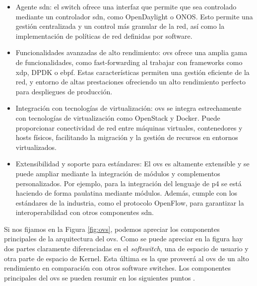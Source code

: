 \begin{itemize}
    \item Agente \gls{sdn}: el switch ofrece una interfaz que permite que sea controlado mediante un controlador \gls{sdn}, como OpenDaylight o ONOS. Esto permite una gestión centralizada y un control más granular de la red, así como la implementación de políticas de red definidas por software.
    \item Funcionalidades avanzadas de alto rendimiento: \gls{ovs} ofrece una amplia gama de funcionalidades, como fast-forwarding al trabajar con frameworks como \gls{xdp}, DPDK o \gls{ebpf}. Estas características permiten una gestión eficiente de la red, y entorno de altas prestaciones ofreciendo un alto rendimiento perfecto para despliegues de producción.
    \item Integración con tecnologías de virtualización: \gls{ovs} se integra estrechamente con tecnologías de virtualización como OpenStack y Docker. Puede proporcionar conectividad de red entre máquinas virtuales, contenedores y hosts físicos, facilitando la migración y la gestión de recursos en entornos virtualizados.
    \item Extensibilidad y soporte para estándares: El \gls{ovs} es altamente extensible y se puede ampliar mediante la integración de módulos y complementos personalizados. Por ejemplo, para la integración del lenguaje de \gls{p4} se está haciendo de forma paulatina mediante módulos. Además, cumple con los estándares de la industria, como el protocolo OpenFlow, para garantizar la interoperabilidad con otros componentes \gls{sdn}.
\end{itemize}

Si nos fijamos en la Figura \ref{fig:ovs}, podemos apreciar los componentes principales de la arquitectura del \gls{ovs}. Como se puede apreciar en la figura hay dos partes claramente diferenciadas en el \textit{softswitch}, una de espacio de usuario y otra parte de espacio de Kernel. Esta última es la que proveerá al \gls{ovs} de un alto rendimiento en comparación con otros software switches.  Los componentes principales del \gls{ovs} se pueden resumir en los siguientes puntos \cite{ovs1}.

